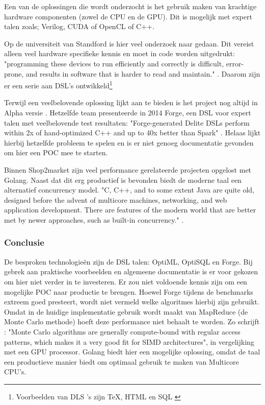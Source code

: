 Een van de oplossingen die wordt onderzocht is het gebruik maken van krachtige hardware componenten (zowel de CPU en de GPU). Dit is mogelijk met expert talen zoals; Verilog, CUDA of OpenCL of C++.


Op de universiteit van Standford is hier veel onderzoek naar gedaan. Dit vereist alleen veel hardware specifieke kennis en moet in code worden uitgedrukt: "programming these devices to run efficiently and correctly is difficult, error-prone, and results in software that is harder to read and maintain." \parencite{sujeeth2011optiml}. Daarom zijn er een serie aan DSL's ontwikkeld\footnote{Voorbeelden van DLS 's zijn \TeX, HTML en SQL  \parencite{sigplan2000dsl}}

Terwijl \textcite{sujeeth2011optiml} een veelbelovende oplossing lijkt aan te bieden is het project nog altijd in Alpha versie \parencite{optiml_project_home}. Hetzelfde team presenteerde in 2014 Forge, een DSL voor expert talen met veelbelovende test resultaten: "Forge-generated Delite DSLs perform within 2x of hand-optimized C++ and up to 40x better than Spark" \parencite{sujeeth2014forge}. Helaas lijkt hierbij hetzelfde probleem te spelen en is er niet genoeg documentatie gevonden om hier een POC mee te starten.

Binnen Shop2market zijn veel performance gerelateerde projecten opgelost met Golang. Naast dat dit erg productief is bevonden biedt de moderne taal een alternatief concurrency model. "C, C++, and to some extent Java are quite old, designed before the advent of multicore machines, networking, and web application development. There are features of the modern world that are better met by newer approaches, such as built-in concurrency." \parencite{pike2012go}.

\subsubsection{\textbf{Conclusie}}

De besproken technologieën zijn de DSL talen: OptiML, OptiSQL en Forge. Bij gebrek aan praktische voorbeelden en algemeene documentatie is er voor gekozen om hier niet verder in te investeren. Er zou niet voldoende kennis zijn om een mogelijke POC naar productie te brengen. Hoewel Forge tijdens de benchmarks extreem goed presteert, wordt niet vermeld welke algoritmes hierbij zijn gebruikt. Omdat in de huidige implementatie gebruik wordt maakt van MapReduce (de Monte Carlo methode) hoeft deze performance niet behaalt te worden. Zo schrijft \textcite{lee2010debunking}: "Monte Carlo algorithms are generally compute-bound with regular access patterns, which makes it a very good fit for SIMD architectures", in vergelijking met een GPU processor. Golang biedt hier een mogelijke oplossing, omdat de taal een productieve manier biedt om optimaal gebruik te maken van Multicore CPU's.

